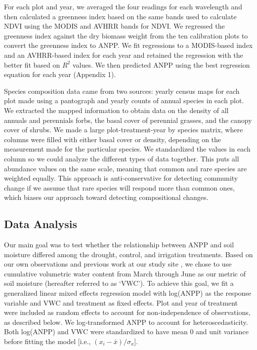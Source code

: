 \documentclass[fleqn,10pt,lineno]{wlpeerj} %
\begin{document}
For each plot and year, we averaged the four readings for each
wavelength and then calculated a greenness index based on the same bands
used to calculate NDVI using the MODIS and AVHRR bands for NDVI. We
regressed the greenness index against the dry biomass weight from the
ten calibration plots to convert the greenness index to ANPP. We fit
regressions to a MODIS-based index and an AVHRR-based index for each
year and retained the regression with the better fit based on \(R^2\)
values. We then predicted ANPP using the best regression equation for
each year (Appendix 1).

Species composition data came from two sources: yearly census maps for
each plot made using a pantograph \citep{Hill1920} and yearly counts of
annual species in each plot. We extracted the mapped information to
obtain data on the density of all annuals and perennials forbs, the
basal cover of perennial grasses, and the canopy cover of shrubs. We
made a large plot-treatment-year by species matrix, where columns were
filled with either basal cover or density, depending on the measurement
made for the particular species. We standardized the values in each
column so we could analyze the different types of data together. This
puts all abundance values on the same scale, meaning that common and
rare species are weighted equally. This approach is anti-conservative
for detecting community change if we assume that rare species will
respond more than common ones, which biases our approach toward
detecting compositional changes.

\subsection{Data Analysis}\label{data-analysis}

Our main goal was to test whether the relationship between ANPP and soil
moisture differed among the drought, control, and irrigation treatments.
Based on our own observations and previous work at our study site
\citep{Blaisdell1958, Dalgleish2011, Adler2012}, we chose to use
cumulative volumetric water content from March through June as our
metric of soil moisture (hereafter referred to as `VWC'). To achieve
this goal, we fit a generalized linear mixed effects regression model
with log(ANPP) as the response variable and VWC and treatment as fixed
effects. Plot and year of treatment were included as random effects to
account for non-independence of observations, as described below. We
log-transformed ANPP to account for heteroscedasticity. Both log(ANPP)
and VWC were standardized to have mean 0 and unit variance before
fitting the model {[}i.e., \((x_i - \bar{x})/\sigma_x\){]}.
\end{document}
